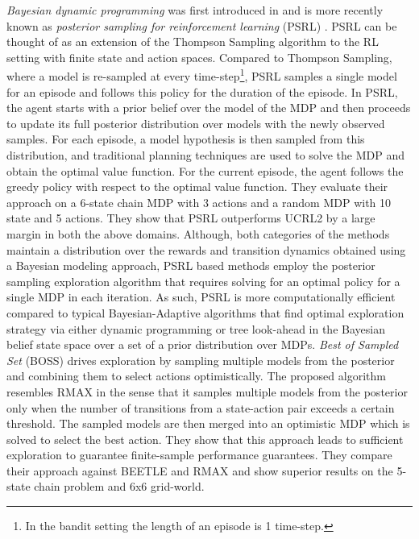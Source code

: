 \textit{Bayesian dynamic programming} was first introduced in  and is more recently known as \textit{posterior sampling for reinforcement learning} (PSRL) . PSRL can be thought of as an extension of the Thompson Sampling algorithm to the RL setting with finite state and action spaces.  
Compared to Thompson Sampling, where a model is re-sampled at every time-step\footnote{In the bandit setting the length of an episode is 1 time-step.}, PSRL samples a single model for an episode and follows this policy for the duration of the episode.
In PSRL, the agent starts with a prior belief over the model of the MDP 
and then proceeds to update its full posterior distribution over models with the newly observed samples. For each episode, a model hypothesis is then sampled from this distribution, and traditional planning techniques are used to solve the MDP and obtain the optimal value function. For the current episode, the agent follows the greedy policy with respect to the optimal value function. They evaluate their approach on a 6-state chain MDP with 3 actions and a random MDP with 10 state and 5 actions. They show that PSRL outperforms UCRL2 by a large margin in both the above domains.  
Although, both categories of the methods maintain a distribution over the rewards and transition dynamics obtained using a Bayesian modeling approach, PSRL based methods employ the posterior sampling exploration algorithm that requires solving for an optimal policy for a single MDP in each iteration. As such, PSRL is more computationally efficient compared to typical Bayesian-Adaptive algorithms that find optimal exploration strategy via either dynamic programming or tree look-ahead in the Bayesian belief state space over a set of a prior distribution over MDPs.
\textit{Best of Sampled Set} (BOSS)  drives exploration by sampling multiple models from the posterior and combining them to select actions optimistically.   The proposed algorithm resembles RMAX  in the sense that it samples multiple models from the posterior only when the number of transitions from a state-action pair exceeds a certain threshold. The sampled models are then merged into an optimistic MDP which is solved to select the best action. They show that this approach leads to sufficient exploration to guarantee finite-sample performance guarantees.  They compare their approach against BEETLE and RMAX and show superior results on the 5-state chain problem and 6x6 grid-world.
